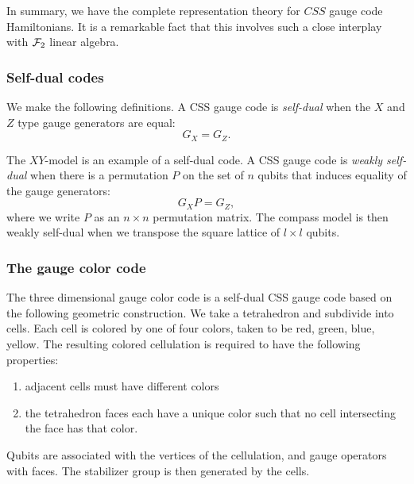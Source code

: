 \documentclass[12pt]{article}
\begin{document}
In summary, we have the
complete representation
theory for $CSS$ gauge code Hamiltonians.
It is a remarkable fact that this involves such
a close interplay with $\mathcal{F}_2$ linear algebra.

\subsubsection{Self-dual codes}

We make the following definitions.
A CSS gauge code is \emph{self-dual} when the $X$ and $Z$ type
gauge generators are equal: $$G_X = G_Z.$$

The $XY$-model is an example of a self-dual code.
A CSS gauge code is \emph{weakly self-dual}
when there is a permutation $P$ on the set of $n$ qubits
that induces equality of the gauge generators:
$$
    G_X P = G_Z,
$$
where we write $P$ as an $n\times n$ permutation matrix.
The compass model is then weakly self-dual when we transpose
the square lattice of $l\times l$ qubits.


\subsubsection{The gauge color code}

%

The three dimensional gauge color code \cite{Bombin2015,Bombin2015single}
is a self-dual CSS gauge code 
based on the following geometric construction.
We take a tetrahedron and subdivide into cells.
Each cell is colored by one of four colors,
taken to be red, green, blue, yellow.
The resulting colored cellulation is required to have the following
properties:
\begin{enumerate}
\item adjacent cells must have different colors
\item the tetrahedron faces each have a unique color
such that no cell intersecting the face has that color.
\end{enumerate}

Qubits are associated with the vertices of the cellulation,
and gauge operators with faces.
The stabilizer group is then generated by the cells.
\end{document}
